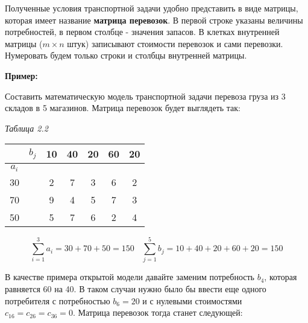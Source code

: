 \documentclass[a4paper,12pt]{article}
\begin{document}
	Полученные условия транспортной задачи удобно представить в виде матрицы, которая имеет название \textbf{матрица перевозок}. В первой строке указаны величины потребностей, в первом столбце - значения запасов. В клетках внутренней матрицы ($m \times n$ штук) записывают стоимости перевозок и сами перевозки. Нумеровать будем только строки и столбцы внутренней матрицы.
	
	\textbf{Пример:}
	
	Составить математическую модель транспортной задачи перевоза груза из 3 складов в 5 магазинов. Матрица перевозок будет выглядеть так:
	\begin{flushright}
		\textit{Таблица 2.2}
	\end{flushright}
	\begin{center}
		\begin{tabular}{c|cccccc}
			\cline{2-7}
			& \multicolumn{1}{c|}{$b_j$} & \multicolumn{1}{c|}{10} & \multicolumn{1}{c|}{40} & \multicolumn{1}{c|}{20} & \multicolumn{1}{c|}{60} & \multicolumn{1}{c|}{20} \\ \hline
			\multicolumn{1}{|c|}{$a_i$} &  &  &  &  &  &  \\ \cline{1-1} \cline{3-7} 
			\multicolumn{1}{|c|}{30} & \multicolumn{1}{c|}{} & \multicolumn{1}{c|}{2} & \multicolumn{1}{c|}{7} & \multicolumn{1}{c|}{3} & \multicolumn{1}{c|}{6} & \multicolumn{1}{c|}{2} \\ \cline{1-1} \cline{3-7} 
			\multicolumn{1}{|c|}{70} & \multicolumn{1}{c|}{} & \multicolumn{1}{c|}{9} & \multicolumn{1}{c|}{4} & \multicolumn{1}{c|}{5} & \multicolumn{1}{c|}{7} & \multicolumn{1}{c|}{3} \\ \cline{1-1} \cline{3-7} 
			\multicolumn{1}{|c|}{50} & \multicolumn{1}{c|}{} & \multicolumn{1}{c|}{5} & \multicolumn{1}{c|}{7} & \multicolumn{1}{c|}{6} & \multicolumn{1}{c|}{2} & \multicolumn{1}{c|}{4} \\ \cline{1-1} \cline{3-7} 
		\end{tabular}
	\end{center}

	\[
		 \sum\limits_{i=1}^3 a_{i} = 30 + 70 + 50 = 150 \ \ \ \
		 \sum\limits_{j=1}^5 b_{j} = 10 + 40 + 20 + 60 + 20 = 150 
	\]
	
	В качестве примера открытой модели давайте заменим потребность $b_4$, которая равняется 60 на 40. В таком случаи нужно было бы ввести еще одного потребителя с потребностью $b_6 = 20$ и с нулевыми стоимостями $c_{16} = c_{26} = c_{36} = 0$. Матрица перевозок тогда станет следующей:
	
\end{document}
